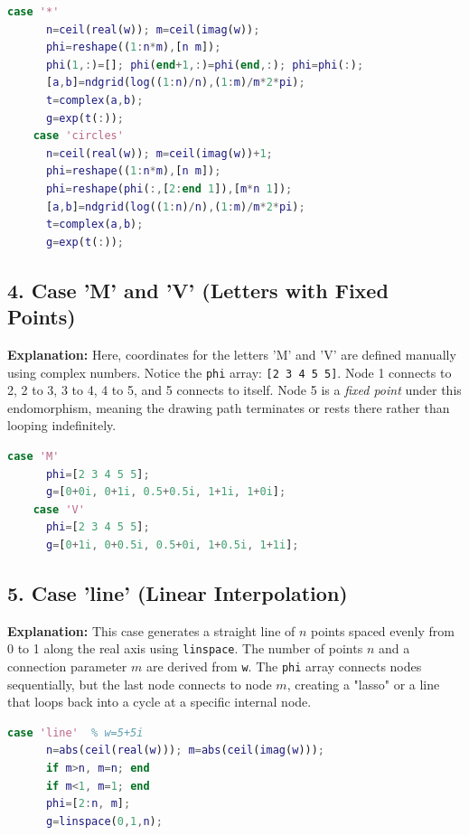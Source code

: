 \begin{lstlisting}[language=Matlab]
  case '*'
      n=ceil(real(w)); m=ceil(imag(w));
      phi=reshape((1:n*m),[n m]);
      phi(1,:)=[]; phi(end+1,:)=phi(end,:); phi=phi(:);
      [a,b]=ndgrid(log((1:n)/n),(1:m)/m*2*pi);
      t=complex(a,b);
      g=exp(t(:));
    case 'circles'
      n=ceil(real(w)); m=ceil(imag(w))+1;
      phi=reshape((1:n*m),[n m]);
      phi=reshape(phi(:,[2:end 1]),[m*n 1]);
      [a,b]=ndgrid(log((1:n)/n),(1:m)/m*2*pi);
      t=complex(a,b);
      g=exp(t(:));
\end{lstlisting}

\subsection{4. Case 'M' and 'V' (Letters with Fixed Points)}
\textbf{Explanation:} Here, coordinates for the letters 'M' and 'V' are defined manually using complex numbers. Notice the \texttt{phi} array: \texttt{[2 3 4 5 5]}. Node 1 connects to 2, 2 to 3, 3 to 4, 4 to 5, and 5 connects to itself. Node 5 is a \textit{fixed point} under this endomorphism, meaning the drawing path terminates or rests there rather than looping indefinitely.

\begin{lstlisting}[language=Matlab]
      case 'M'
      phi=[2 3 4 5 5];
      g=[0+0i, 0+1i, 0.5+0.5i, 1+1i, 1+0i];
    case 'V'
      phi=[2 3 4 5 5];
      g=[0+1i, 0+0.5i, 0.5+0i, 1+0.5i, 1+1i];
\end{lstlisting}

\subsection{5. Case 'line' (Linear Interpolation)}
\textbf{Explanation:} This case generates a straight line of $n$ points spaced evenly from 0 to 1 along the real axis using \texttt{linspace}. The number of points $n$ and a connection parameter $m$ are derived from \texttt{w}. The \texttt{phi} array connects nodes sequentially, but the last node connects to node $m$, creating a "lasso" or a line that loops back into a cycle at a specific internal node.

\begin{lstlisting}[language=Matlab]
    case 'line'  % w=5+5i
      n=abs(ceil(real(w))); m=abs(ceil(imag(w)));
      if m>n, m=n; end
      if m<1, m=1; end
      phi=[2:n, m];
      g=linspace(0,1,n);
\end{lstlisting}

